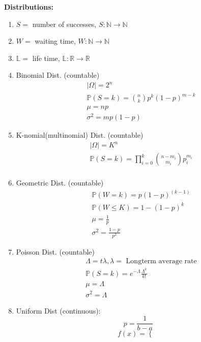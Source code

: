 \documentclass[12pt]{article}
\newcommand{\abs}[1]{\left| #1 \right|} %
\renewcommand{\=}[1]{\stackrel{#1}{=}} %
\theoremstyle{definition}
\theoremstyle{remark}
\begin{document}
  \newpage
  \textbf{Distributions:}
  \begin{enumerate}
  \item $S = $ number of successes, $S: \mathbb{N} \rightarrow \mathbb{N}$
  \item $W=$ waiting time, $W:\mathbb{N} \rightarrow \mathbb{N}$
  \item $\mathbb{L}=$ life time, $\mathbb{L}: \mathbb{R} \rightarrow \mathbb{R}$
  \item Binomial Dist. (countable)
    \begin{align*}
      &\abs{\Omega} = 2^n \\
      &\mathbb{P}(S = k) = \binom{n}{k} p^k(1-p)^{m-k} \\
      &\mu = np \\
      &\sigma^2 = mp(1-p)
    \end{align*}
  \item K-nomial(multinomial) Dist. (countable)
    \begin{align*}
      &\abs{\Omega} = K^n \\
      &\mathbb{P}(S = k) = \prod_{i=0}^k \binom{n-m_i}{m_i} p_i^{m_i} \\
    \end{align*}
  \item Geometric Dist. (countable)
    \begin{align*}
      &\mathbb{P}(W=k)=p(1-p)^{(k-1)} \\
      &\mathbb{P}(W\leq K) = 1-(1-p)^k \\
      &\mu = \frac{1}{p} \\
      &\sigma^2= \frac{1-p}{p^2}
    \end{align*}
  \item Poisson Dist. (countable)
    \begin{align*}
      &\Lambda = t\lambda, \lambda = \textrm{ Longterm average rate} \\
      &\mathbb{P}(S=k) = e^{-\Lambda}\frac{\Lambda^k}{k!} \\
      &\mu = \Lambda \\
      &\sigma^2 = \Lambda
    \end{align*}
  \item Uniform Dist (continuous):\\
    \begin{equation}
      p = \frac{1}{b-a}
    \end{equation}
    \begin{displaymath}
      f(x) = \left\{
        \begin{array}{lr}

\end{array}
\end{displaymath}
\end{enumerate}
\end{document}
